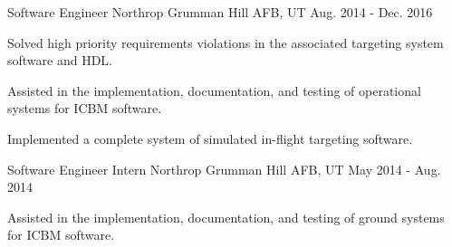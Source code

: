 \begin{cventries}

\cventry
{Software Engineer} %
{Northrop Grumman} %
{Hill AFB, UT} %
{Aug. 2014 - Dec. 2016} %
{ %
\begin{cvitems}
\item \small Solved high priority requirements violations in the associated targeting system software and HDL.
\item \small Assisted in the implementation, documentation, and testing of operational systems for ICBM software.
\item \small Implemented a complete system of simulated in-flight targeting software.
\end{cvitems}
}



\cventry
{Software Engineer Intern} %
{Northrop Grumman} %
{Hill AFB, UT} %
{May 2014 - Aug. 2014} %
{ %
\begin{cvitems}
\item \small Assisted in the implementation, documentation, and testing of ground systems for ICBM software.
\end{cvitems}
}

\end{cventries}